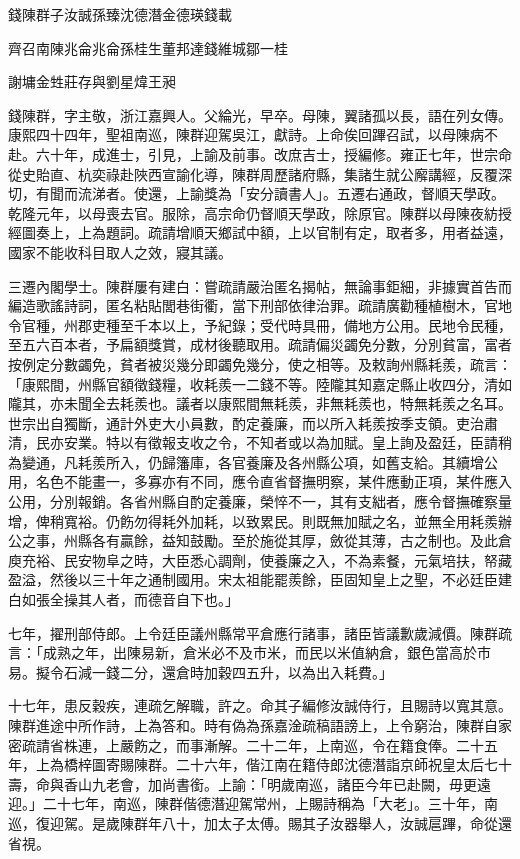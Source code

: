 
\begin{pinyinscope}
錢陳群子汝誠孫臻沈德潛金德瑛錢載

齊召南陳兆侖兆侖孫桂生董邦達錢維城鄒一桂

謝墉金甡莊存與劉星煒王昶

錢陳群，字主敬，浙江嘉興人。父綸光，早卒。母陳，翼諸孤以長，語在列女傳。康熙四十四年，聖祖南巡，陳群迎駕吳江，獻詩。上命俟回蹕召試，以母陳病不赴。六十年，成進士，引見，上諭及前事。改庶吉士，授編修。雍正七年，世宗命從史貽直、杭奕祿赴陜西宣諭化導，陳群周歷諸府縣，集諸生就公廨講經，反覆深切，有聞而流涕者。使還，上諭獎為「安分讀書人」。五遷右通政，督順天學政。乾隆元年，以母喪去官。服除，高宗命仍督順天學政，除原官。陳群以母陳夜紡授經圖奏上，上為題詞。疏請增順天鄉試中額，上以官制有定，取者多，用者益遠，國家不能收科目取人之效，寢其議。

三遷內閣學士。陳群屢有建白：嘗疏請嚴治匿名揭帖，無論事鉅細，非據實首告而編造歌謠詩詞，匿名粘貼閭巷街衢，當下刑部依律治罪。疏請廣勸種植樹木，官地令官種，州郡吏種至千本以上，予紀錄；受代時具冊，備地方公用。民地令民種，至五六百本者，予扁額獎賞，成材後聽取用。疏請偏災蠲免分數，分別貧富，富者按例定分數蠲免，貧者被災幾分即蠲免幾分，使之相等。及敕詢州縣耗羨，疏言：「康熙間，州縣官額徵錢糧，收耗羨一二錢不等。陸隴其知嘉定縣止收四分，清如隴其，亦未聞全去耗羨也。議者以康熙間無耗羨，非無耗羨也，特無耗羨之名耳。世宗出自獨斷，通計外吏大小員數，酌定養廉，而以所入耗羨按季支領。吏治肅清，民亦安業。特以有徵報支收之令，不知者或以為加賦。皇上詢及盈廷，臣請稍為變通，凡耗羨所入，仍歸籓庫，各官養廉及各州縣公項，如舊支給。其續增公用，名色不能畫一，多寡亦有不同，應令直省督撫明察，某件應動正項，某件應入公用，分別報銷。各省州縣自酌定養廉，榮悴不一，其有支絀者，應令督撫確察量增，俾稍寬裕。仍飭勿得耗外加耗，以致累民。則既無加賦之名，並無全用耗羨辦公之事，州縣各有贏餘，益知鼓勵。至於施從其厚，斂從其薄，古之制也。及此倉庾充裕、民安物阜之時，大臣悉心調劑，使養廉之入，不為素餐，元氣培扶，帑藏盈溢，然後以三十年之通制國用。宋太祖能罷羨餘，臣固知皇上之聖，不必廷臣建白如張全操其人者，而德音自下也。」

七年，擢刑部侍郎。上令廷臣議州縣常平倉應行諸事，諸臣皆議歉歲減價。陳群疏言：「成熟之年，出陳易新，倉米必不及市米，而民以米值納倉，銀色當高於市易。擬令石減一錢二分，還倉時加穀四五升，以為出入耗費。」

十七年，患反穀疾，連疏乞解職，許之。命其子編修汝誠侍行，且賜詩以寬其意。陳群進途中所作詩，上為答和。時有偽為孫嘉淦疏稿語謗上，上令窮治，陳群自家密疏請省株連，上嚴飭之，而事漸解。二十二年，上南巡，令在籍食俸。二十五年，上為橋梓圖寄賜陳群。二十六年，偕江南在籍侍郎沈德潛詣京師祝皇太后七十壽，命與香山九老會，加尚書銜。上諭：「明歲南巡，諸臣今年已赴闕，毋更遠迎。」二十七年，南巡，陳群偕德潛迎駕常州，上賜詩稱為「大老」。三十年，南巡，復迎駕。是歲陳群年八十，加太子太傅。賜其子汝器舉人，汝誠扈蹕，命從還省視。


\end{pinyinscope}

